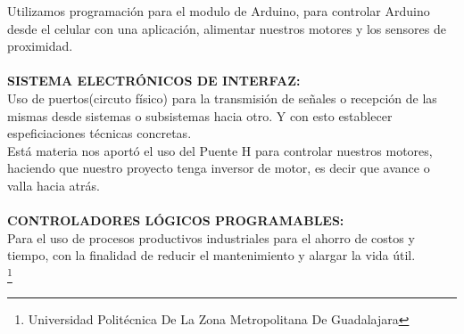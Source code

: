 \documentclass[11pt,a4paper]{article}
\begin{document}
Utilizamos programación para el modulo de Arduino, para controlar Arduino desde el celular con una aplicación, alimentar nuestros motores y los sensores de proximidad.\\\\
\textbf{SISTEMA ELECTRÓNICOS DE INTERFAZ:}\\ Uso de puertos(circuto físico) para la transmisión de señales o recepción de las mismas desde sistemas o subsistemas hacia otro. Y con esto establecer espeficiaciones técnicas concretas.\\
Está materia nos aportó el uso del Puente H para controlar nuestros motores, haciendo que nuestro proyecto tenga inversor de motor, es decir que avance o valla hacia atrás. \\\\
\textbf{CONTROLADORES LÓGICOS PROGRAMABLES:}\\ Para el uso de procesos productivos industriales para el ahorro de costos y tiempo, con la finalidad de reducir el mantenimiento y alargar la vida útil.\\

 \footnote{Universidad Politécnica De La Zona Metropolitana De Guadalajara} 
\newpage
\end{document}
